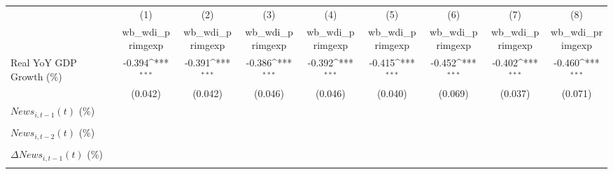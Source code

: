 {
\def\sym#1{\ifmmode^{#1}\else\(^{#1}\)\fi}
\begin{tabular}{l*{8}{c}}
\toprule
                    &\multicolumn{1}{c}{(1)}&\multicolumn{1}{c}{(2)}&\multicolumn{1}{c}{(3)}&\multicolumn{1}{c}{(4)}&\multicolumn{1}{c}{(5)}&\multicolumn{1}{c}{(6)}&\multicolumn{1}{c}{(7)}&\multicolumn{1}{c}{(8)}\\
                    &\multicolumn{1}{c}{wb_wdi_primgexp}&\multicolumn{1}{c}{wb_wdi_primgexp}&\multicolumn{1}{c}{wb_wdi_primgexp}&\multicolumn{1}{c}{wb_wdi_primgexp}&\multicolumn{1}{c}{wb_wdi_primgexp}&\multicolumn{1}{c}{wb_wdi_primgexp}&\multicolumn{1}{c}{wb_wdi_primgexp}&\multicolumn{1}{c}{wb_wdi_primgexp}\\
\midrule
Real YoY GDP Growth (\%)&      -0.394\sym{***}&      -0.391\sym{***}&      -0.386\sym{***}&      -0.392\sym{***}&      -0.415\sym{***}&      -0.452\sym{***}&      -0.402\sym{***}&      -0.460\sym{***}\\
                    &     (0.042)         &     (0.042)         &     (0.046)         &     (0.046)         &     (0.040)         &     (0.069)         &     (0.037)         &     (0.071)         \\
\addlinespace
$ News_{i,t-1}(t)$ (\%)&                     &                     &                     &                     &                     &                     &                     &                     \\
                    &                     &                     &                     &                     &                     &                     &                     &                     \\
\addlinespace
$ News_{i,t-2}(t)$ (\%)&                     &                     &                     &                     &                     &                     &                     &                     \\
                    &                     &                     &                     &                     &                     &                     &                     &                     \\
\addlinespace
$ \Delta News_{i,t-1}(t)$ (\%)&                     &                     &                     &                     &                     &                     &                     &                     \\
                    &                     &                     &                     &                     &                     &                     &                     &                     \\

\end{tabular}}
